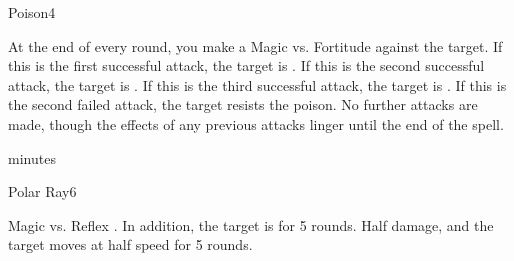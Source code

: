 \begin{spellsection}{Poison}{4}
    \begin{spellheader}
    \end{spellheader}
    \begin{spellcontent}
        \begin{spelltargetinginfo}
        \end{spelltargetinginfo}
        \begin{spelleffects}
            \begin{spellattacktriggered}{At the end of every round, you make a Magic vs. Fortitude against the target.}
                \spellsuccess If this is the first successful attack, the target is \sickened. If this is the second successful attack, the target is \nauseated. If this is the third successful attack, the target is \paralyzed.
                \spellfailure If this is the second failed attack, the target resists the poison. No further attacks are made, though the effects of any previous attacks linger until the end of the spell.
            \end{spellattacktriggered}
             minutes
        \end{spelleffects}
    \end{spellcontent}
    \begin{spellfooter}
        \spellnotes \physicalspellnotes
        \miscastrandom
    \end{spellfooter}
\end{spellsection}

\begin{spellsection}{Polar Ray}{6}
    \begin{spellheader}
    \end{spellheader}
    \begin{spellcontent}
        \begin{spelltargetinginfo}
        \end{spelltargetinginfo}
        \begin{spelleffects}
            \begin{spellattack}{Magic vs. Reflex}
                \spellsuccess {}. In addition, the target is \slowed for 5 rounds.
                \spellfailure Half damage, and the target moves at half speed for 5 rounds.
            \end{spellattack}
        \end{spelleffects}
    \end{spellcontent}
    \begin{spellfooter}
        \miscastrandom
    \end{spellfooter}
\end{spellsection}

